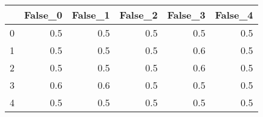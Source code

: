 \begin{tabular}{lrrrrr}
\toprule
{} &  False\_0 &  False\_1 &  False\_2 &  False\_3 &  False\_4 \\ \hline
\midrule
0 &      0.5 &      0.5 &      0.5 &      0.5 &      0.5 \\ \hline
1 &      0.5 &      0.5 &      0.5 &      0.6 &      0.5 \\ \hline
2 &      0.5 &      0.5 &      0.5 &      0.6 &      0.5 \\ \hline
3 &      0.6 &      0.6 &      0.5 &      0.5 &      0.5 \\ \hline
4 &      0.5 &      0.5 &      0.5 &      0.5 &      0.5 \\ \hline
\bottomrule
\end{tabular}
